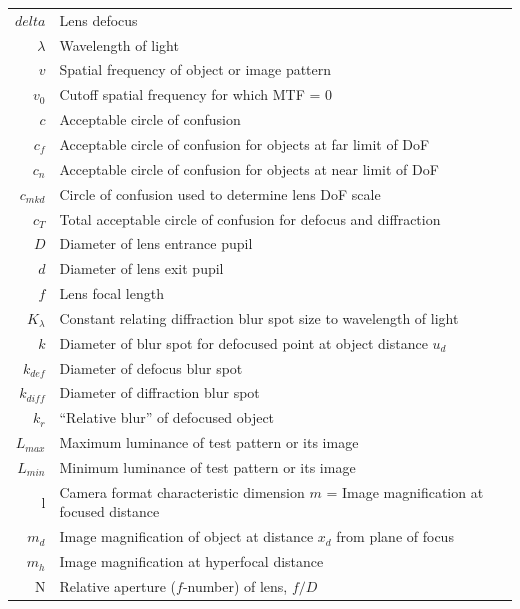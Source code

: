 \documentclass[11pt, oneside]{scrartcl}   	%
\begin{document}
\begin{center}
\begin{tabular}{r@{~=~}l}
$delta$ & Lens defocus     \\
$\lambda$ & Wavelength of light     \\
$v$ & Spatial frequency of object or image pattern     \\
$v_0$ & Cutoff spatial frequency for which MTF = 0      \\
$c$ & Acceptable circle of confusion     \\
$c_f$ & Acceptable circle of confusion for objects at far limit of DoF     \\
$c_n$ & Acceptable circle of confusion for objects at near limit of
        DoF     \\
$c_{mkd}$ & Circle of confusion used to determine lens DoF scale     \\
$c_T$ & Total acceptable circle of confusion for defocus and
        diffraction     \\
$D$ & Diameter of lens entrance pupil      \\
$d$ & Diameter of lens exit pupil     \\
$f$ & Lens focal length     \\
$K_\lambda$ & Constant relating diffraction blur spot size to
              wavelength of light     \\
$k$ & Diameter of blur spot for defocused point at object distance
      $u_d$     \\
$k_{def}$ & Diameter of defocus blur spot     \\
$k_{diff}$ & Diameter of diffraction blur spot     \\
$k_{r}$ & “Relative blur” of defocused object     \\
$L_{max}$ & Maximum luminance of test pattern or its image      \\
$L_{min}$ & Minimum luminance of test pattern or its image     \\
l & Camera format characteristic dimension $m$ = Image magnification at
                                               focused distance     \\
$m_{d}$ & Image magnification of object at distance $x_d$ from plane of
     focus      \\
$m_{h}$ & Image magnification at hyperfocal distance     \\
N & Relative aperture ($f$-number) of lens, $f/D$     \\

\end{tabular}
\end{center}
\end{document}
